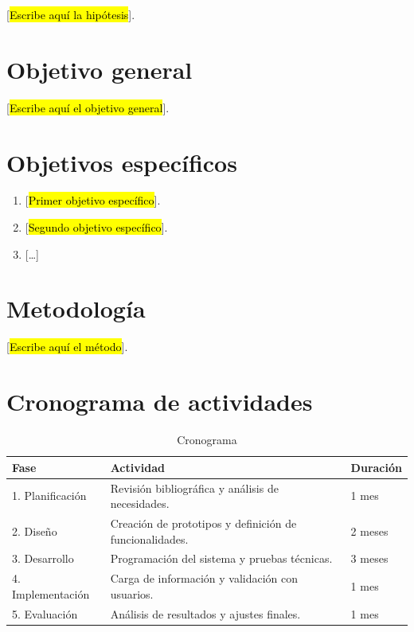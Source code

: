 \documentclass[12pt,letterpaper]{report}
\begin{document}
[\hl{Escribe aquí la hipótesis}].

\section{Objetivo general}

[\hl{Escribe aquí el objetivo general}].

\section{Objetivos específicos}

\begin{enumerate}
  \item{} [\hl{Primer objetivo específico}].
  \item{} [\hl{Segundo objetivo específico}].
  \item{} [\ldots]
\end{enumerate}

\section{Metodología}

[\hl{Escribe aquí el método}].

\section{Cronograma de actividades}

\begin{table}[htbp]
\centering
\caption{Cronograma}
\label{tab:cronograma}
\begin{tabular}{lp{10cm}l}
\toprule
\textbf{Fase} & \textbf{Actividad} & \textbf{Duración} \\
\midrule
1. Planificación   & Revisión bibliográfica y análisis de necesidades.         & 1 mes \\
2. Diseño          & Creación de prototipos y definición de funcionalidades.   & 2 meses \\
3. Desarrollo      & Programación del sistema y pruebas técnicas.              & 3 meses \\
4. Implementación  & Carga de información y validación con usuarios.           & 1 mes \\
5. Evaluación      & Análisis de resultados y ajustes finales.                 & 1 mes \\
\bottomrule
\end{tabular}
\end{table}
\end{document}
